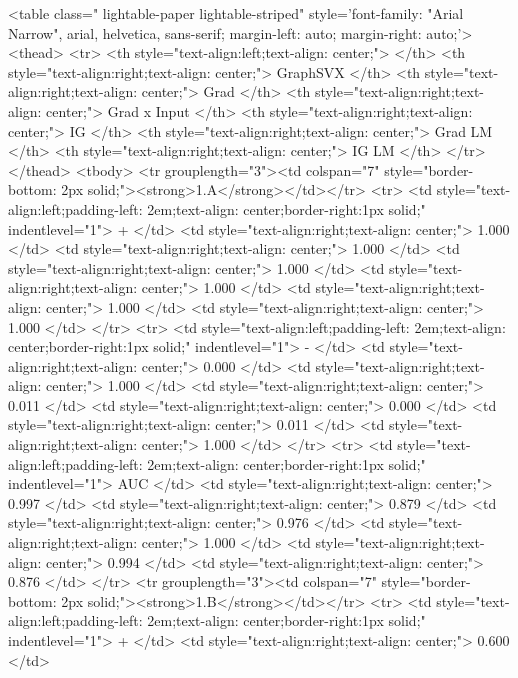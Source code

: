 <table class=" lightable-paper lightable-striped" style='font-family: "Arial Narrow", arial, helvetica, sans-serif; margin-left: auto; margin-right: auto;'>
 <thead>
  <tr>
   <th style="text-align:left;text-align: center;">  </th>
   <th style="text-align:right;text-align: center;"> GraphSVX </th>
   <th style="text-align:right;text-align: center;"> Grad </th>
   <th style="text-align:right;text-align: center;"> Grad x Input </th>
   <th style="text-align:right;text-align: center;"> IG </th>
   <th style="text-align:right;text-align: center;"> Grad LM </th>
   <th style="text-align:right;text-align: center;"> IG LM </th>
  </tr>
 </thead>
<tbody>
  <tr grouplength="3"><td colspan="7" style="border-bottom: 2px solid;"><strong>1.A</strong></td></tr>
<tr>
   <td style="text-align:left;padding-left: 2em;text-align: center;border-right:1px solid;" indentlevel="1"> + </td>
   <td style="text-align:right;text-align: center;"> 1.000 </td>
   <td style="text-align:right;text-align: center;"> 1.000 </td>
   <td style="text-align:right;text-align: center;"> 1.000 </td>
   <td style="text-align:right;text-align: center;"> 1.000 </td>
   <td style="text-align:right;text-align: center;"> 1.000 </td>
   <td style="text-align:right;text-align: center;"> 1.000 </td>
  </tr>
  <tr>
   <td style="text-align:left;padding-left: 2em;text-align: center;border-right:1px solid;" indentlevel="1"> - </td>
   <td style="text-align:right;text-align: center;"> 0.000 </td>
   <td style="text-align:right;text-align: center;"> 1.000 </td>
   <td style="text-align:right;text-align: center;"> 0.011 </td>
   <td style="text-align:right;text-align: center;"> 0.000 </td>
   <td style="text-align:right;text-align: center;"> 0.011 </td>
   <td style="text-align:right;text-align: center;"> 1.000 </td>
  </tr>
  <tr>
   <td style="text-align:left;padding-left: 2em;text-align: center;border-right:1px solid;" indentlevel="1"> AUC </td>
   <td style="text-align:right;text-align: center;"> 0.997 </td>
   <td style="text-align:right;text-align: center;"> 0.879 </td>
   <td style="text-align:right;text-align: center;"> 0.976 </td>
   <td style="text-align:right;text-align: center;"> 1.000 </td>
   <td style="text-align:right;text-align: center;"> 0.994 </td>
   <td style="text-align:right;text-align: center;"> 0.876 </td>
  </tr>
  <tr grouplength="3"><td colspan="7" style="border-bottom: 2px solid;"><strong>1.B</strong></td></tr>
<tr>
   <td style="text-align:left;padding-left: 2em;text-align: center;border-right:1px solid;" indentlevel="1"> + </td>
   <td style="text-align:right;text-align: center;"> 0.600 </td>
